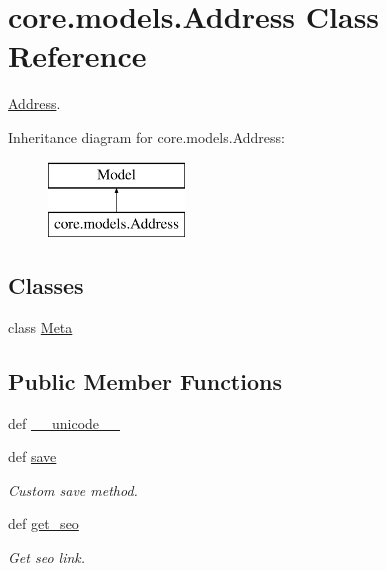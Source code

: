 \hypertarget{classcore_1_1models_1_1Address}{\section{core.\-models.\-Address Class Reference}
\label{classcore_1_1models_1_1Address}
}


\hyperlink{classcore_1_1models_1_1Address}{Address}.  


Inheritance diagram for core.\-models.\-Address\-:\begin{figure}[H]
\begin{center}
\leavevmode
\includegraphics[height=2.000000cm]{classcore_1_1models_1_1Address}
\end{center}
\end{figure}
\subsection*{Classes}
\begin{DoxyCompactItemize}
\item 
class \hyperlink{classcore_1_1models_1_1Address_1_1Meta}{Meta}
\end{DoxyCompactItemize}
\subsection*{Public Member Functions}
\begin{DoxyCompactItemize}
\item 
def \hyperlink{classcore_1_1models_1_1Address_ae7662f36c945c920d731c7a6f0eebdf1}{\-\_\-\-\_\-unicode\-\_\-\-\_\-}
\item 
def \hyperlink{classcore_1_1models_1_1Address_a087d6a195a42b5568b0bd45f6a68723e}{save}
\begin{DoxyCompactList}\small\item\em Custom save method. \end{DoxyCompactList}\item 
def \hyperlink{classcore_1_1models_1_1Address_a118bcbfcb691e9dd708ce2abd3d1dca4}{get\-\_\-seo}
\begin{DoxyCompactList}\small\item\em Get seo link. \end{DoxyCompactList}\end{DoxyCompactItemize}
